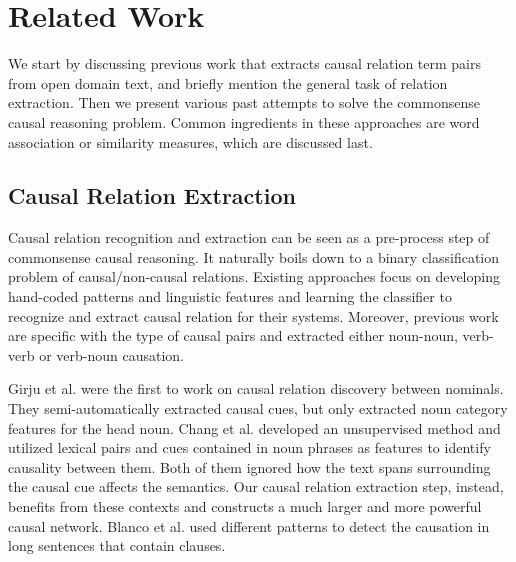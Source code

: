 \section{Related Work}
\label{sec:related}

We start by discussing previous work that extracts causal relation term
pairs from open domain text, and briefly mention the general task of relation
extraction. Then we present various past attempts to solve the
commonsense causal reasoning problem. Common ingredients in these
approaches are word association or similarity measures, which are
discussed last.

\subsection{Causal Relation Extraction}
Causal relation recognition and extraction
can be seen as a pre-process step of commonsense causal reasoning.
It naturally boils down to a binary classification problem of
causal/non-causal relations. Existing approaches focus on developing
hand-coded patterns and linguistic features and learning the
classifier to recognize and extract causal relation for their
systems. Moreover, previous work are specific with the type of
causal pairs and extracted either noun-noun, verb-verb or verb-noun
causation.

Girju et al.
\cite{girju2003automatic} were the first to work on causal relation discovery
between nominals. They semi-automatically extracted causal cues, but only
extracted noun category features for the head noun. Chang et al.
\cite{ChangC04} developed an unsupervised method and
utilized lexical pairs and cues contained in noun phrases as
features to identify causality between them. Both of them ignored
how the text spans surrounding the causal cue
affects the semantics.  Our causal relation extraction
step, instead,  benefits from these contexts and
constructs a much larger and more powerful causal network.
Blanco et al. \cite{blanco2008causal} used
different patterns to detect the causation in long sentences that
contain clauses.

